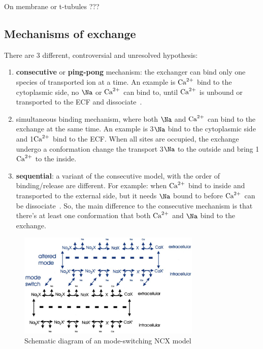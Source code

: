 On membrane or t-tubules ???


% 

\subsection{Mechanisms of exchange}
\label{sec:mechanisms-Ca2+-exchange-via-NCX}

There are 3 different, controversial and unresolved hypothesis:
\begin{enumerate}
\item {\bf consecutive} or {\bf ping-pong} mechanism: the exchanger
  can bind only one species of transported ion at a time. An example
  is ${\text{Ca}^{2+}}$ bind to the cytoplasmic side, no $\Na$ or ${\text{Ca}^{2+}}$ can bind
  to, until ${\text{Ca}^{2+}}$ is unbound or transported to the ECF and
  dissociate~\citep{khananshvili1995}.

\item simultaneous binding mechanism, where both  $\Na$ and ${\text{Ca}^{2+}}$ can
  bind to the exchange at the same time. An example is 3$\Na$ bind to
  the cytoplasmic side and 1${\text{Ca}^{2+}}$ bind to the ECF. When all sites are
  occupied, the exchange undergo a conformation change the transport
  3$\Na$ to the outside and bring 1${\text{Ca}^{2+}}$ to the inside.
\item {\bf sequential}: a variant of the consecutive model, with the
  order of binding/release are different. For example: when ${\text{Ca}^{2+}}$ bind
  to inside and transported to the external side, but it needs $\Na$
  bound to before ${\text{Ca}^{2+}}$ can be dissociate~\citep{milanick1991}. So,
  the main difference to the consecutive mechanism is that there's at
  least one conformation that both ${\text{Ca}^{2+}}$ and $\Na$ bind to the
  exchange. 
\end{enumerate}


\begin{figure}[hbt]
  \centerline{\includegraphics[height=5cm,
    angle=0]{./images/NCX_Blaustein.eps}}
\caption{Schematic diagram of an mode-switching NCX model}
\label{fig:NCX_Blaustein}
\end{figure}



